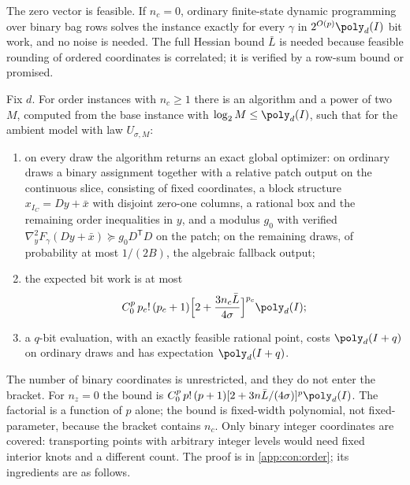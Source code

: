The zero vector is feasible. If $n_c=0$, ordinary finite-state dynamic
programming over binary bag rows solves the instance exactly for every
$\gamma$ in $2^{O(p)}\poly_d(I)$ bit work, and no noise is needed. The full
Hessian bound $\bar L$ is needed because feasible rounding of ordered
coordinates is correlated; it is verified by a row-sum bound or promised.

\begin{theorem}\label{thm:con:order}
Fix $d$. For order instances with $n_c\ge1$ there is an algorithm and a
power of two $M$, computed from the base instance with
$\log_2M\le\poly_d(I)$, such that for the ambient model with law
$U_{\sigma,M}$:
\begin{enumerate}[label=(\roman*)]
\item on every draw the algorithm returns an exact global optimizer: on
ordinary draws a binary assignment together with a relative patch output on
the continuous slice, consisting of fixed coordinates, a block structure
$x_{I_C}=Dy+\bar x$ with disjoint zero-one columns, a rational box and the
remaining order inequalities in $y$, and a modulus $g_0$ with verified
$\nabla^2_yF_\gamma(Dy+\bar x)\succeq g_0D^{\mathsf T}D$ on the patch; on the
remaining draws, of probability at most $1/(2B)$, the algebraic fallback
output;
\item the expected bit work is at most
\begin{equation}\label{eq:con:orderbound}
 C_0^p\,p_c!\,(p_c+1)\Bigl[2+\frac{3n_c\bar L}{4\sigma}\Bigr]^{p_c}\poly_d(I);
\end{equation}
\item a $q$-bit evaluation, with an exactly feasible rational point, costs
$\poly_d(I+q)$ on ordinary draws and has expectation $\poly_d(I+q)$.
\end{enumerate}
\end{theorem}

The number of binary coordinates is unrestricted, and they do not enter the
bracket. For $n_z=0$ the bound is
$C_0^p\,p!\,(p+1)[2+3n\bar L/(4\sigma)]^p\poly_d(I)$. The factorial is a
function of $p$ alone; the bound is fixed-width polynomial, not
fixed-parameter, because the bracket contains $n_c$. Only binary integer
coordinates are covered: transporting points with arbitrary integer levels
would need fixed interior knots and a different count. The proof is in
\cref{app:con:order}; its ingredients are as follows.

